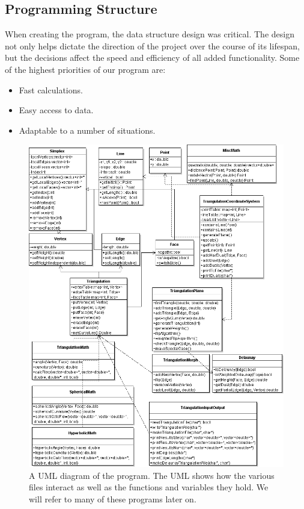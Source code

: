 \documentclass[12pt]{article}
\begin{document}
\subsection{Programming Structure}

 When creating the program, the data structure design was critical. The design not only helps dictate the direction of the project over the course of its lifespan, but the decisions affect the speed and efficiency of all added functionality. Some of the highest priorities of our program are:
 
\begin{itemize}
\item Fast calculations.
\item Easy access to data.
\item Adaptable to a number of situations.
\end{itemize}

\begin{figure}
\begin{center}
\includegraphics[scale = 0.47]{Pictures3/triangulationUML.png}
\end{center}
\caption{A UML diagram of the program. The UML shows how the various files interact as well as the functions and variables they hold. We will refer to many of these programs later on.}
\label{triUML}
\end{figure}
\end{document}
